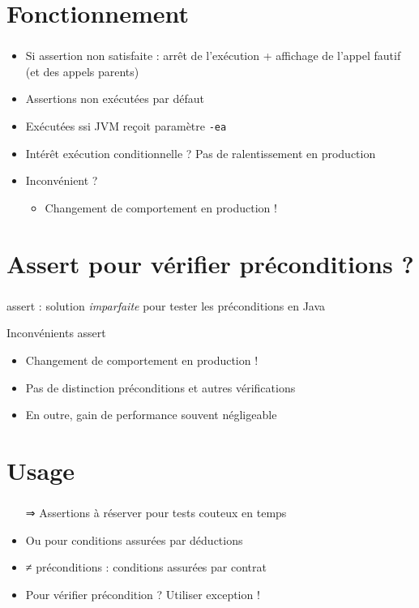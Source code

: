 \documentclass[english, french]{beamer}
\begin{document}
\section{Fonctionnement}
\begin{frame}
	\frametitle{\secname}
	\begin{itemize}
		\item Si assertion non satisfaite : arrêt de l’exécution + affichage de l’appel fautif (et des appels parents)
		\item Assertions non exécutées par défaut
		\item Exécutées ssi JVM reçoit paramètre \texttt{-ea}
		\item Intérêt exécution conditionnelle ? \pause Pas de ralentissement en production \pause
		\item Inconvénient ? \pause
		\begin{itemize}
			\item Changement de comportement en production !
		\end{itemize}
	\end{itemize}
\end{frame}

\section[Préconditions]{Assert pour vérifier préconditions ?}
\begin{frame}
	\frametitle{\secname}
	assert : solution \emph{imparfaite} pour tester les préconditions en Java
	\begin{block}{Inconvénients assert}
		\begin{itemize}
			\item Changement de comportement en production !
			\item Pas de distinction préconditions et autres vérifications
			\item En outre, gain de performance souvent négligeable
		\end{itemize}
	\end{block}
\end{frame}

\section{Usage}
\begin{frame}
	\frametitle{\secname}
	\begin{itemize}
		\item[⇒] Assertions à réserver pour tests couteux en temps
		\item Ou pour conditions assurées par déductions
		\item ≠ préconditions : conditions assurées par contrat
		\item Pour vérifier précondition ? \pause Utiliser exception !
	\end{itemize}
\end{frame}
\end{document}
